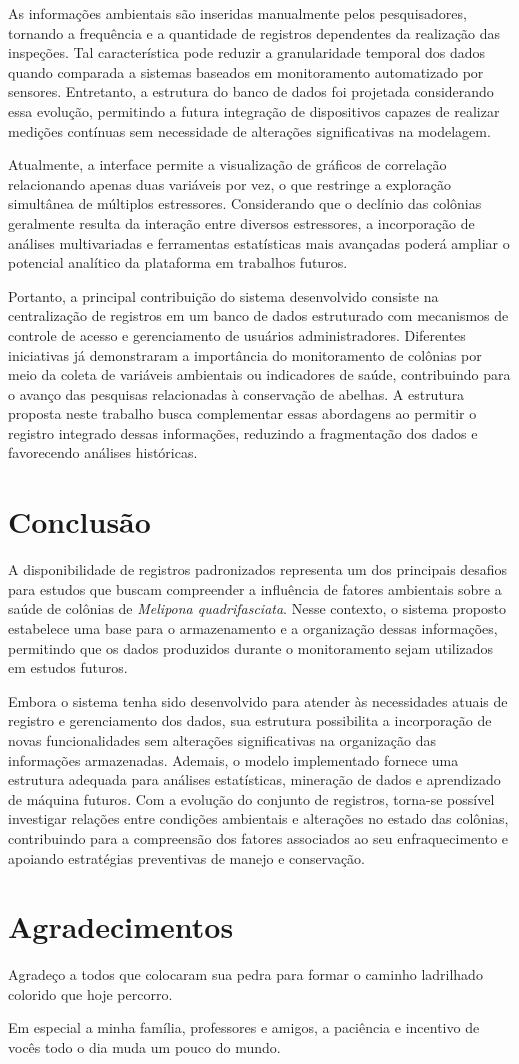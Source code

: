 \documentclass[12pt]{unisenaiclass}
\begin{document}
As informações ambientais são inseridas manualmente pelos pesquisadores, tornando a frequência e a quantidade de registros dependentes da realização das inspeções. Tal característica pode reduzir a granularidade temporal dos dados quando comparada a sistemas baseados em monitoramento automatizado por sensores. Entretanto, a estrutura do banco de dados foi projetada considerando essa evolução, permitindo a futura integração de dispositivos capazes de realizar medições contínuas sem necessidade de alterações significativas na modelagem.

Atualmente, a interface permite a visualização de gráficos de correlação relacionando apenas duas variáveis por vez, o que restringe a exploração simultânea de múltiplos estressores. Considerando que o declínio das colônias geralmente resulta da interação entre diversos estressores, a incorporação de análises multivariadas e ferramentas estatísticas mais avançadas poderá ampliar o potencial analítico da plataforma em trabalhos futuros.

Portanto, a principal contribuição do sistema desenvolvido consiste na centralização de registros em um banco de dados estruturado com mecanismos de controle de acesso e gerenciamento de usuários administradores. Diferentes iniciativas já demonstraram a importância do monitoramento de colônias por meio da coleta de variáveis ambientais ou indicadores de saúde, contribuindo para o avanço das pesquisas relacionadas à conservação de abelhas. A estrutura proposta neste trabalho busca complementar essas abordagens ao permitir o registro integrado dessas informações, reduzindo a fragmentação dos dados e favorecendo análises históricas.

\section{Conclusão}
A disponibilidade de registros padronizados representa um dos principais desafios para estudos que buscam compreender a influência de fatores ambientais sobre a saúde de colônias de \textit{Melipona quadrifasciata}. Nesse contexto, o sistema proposto estabelece uma base para o armazenamento e a organização dessas informações, permitindo que os dados produzidos durante o monitoramento sejam utilizados em estudos futuros.

Embora o sistema tenha sido desenvolvido para atender às necessidades atuais de registro e gerenciamento dos dados, sua estrutura possibilita a incorporação de novas funcionalidades sem alterações significativas na organização das informações armazenadas. Ademais, o modelo implementado fornece uma estrutura adequada para análises estatísticas, mineração de dados e aprendizado de máquina futuros. Com a evolução do conjunto de registros, torna-se possível investigar relações entre condições ambientais e alterações no estado das colônias, contribuindo para a compreensão dos fatores associados ao seu enfraquecimento e apoiando estratégias preventivas de manejo e conservação.

\section*{Agradecimentos}
Agradeço a todos que colocaram sua pedra para formar o caminho ladrilhado colorido que hoje percorro.

Em especial a minha família, professores e amigos, a paciência e incentivo de vocês todo o dia muda um pouco do mundo.


\end{document}
